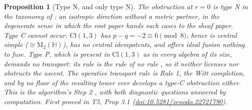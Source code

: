 \documentclass[11pt]{article}
\newtheorem{proposition}[theorem]{Proposition}
\theoremstyle{definition}
\theoremstyle{plain}
\providecommand{\Cl}{}\renewcommand{\Cl}{\mathrm{Cl}}
\providecommand{\HH}{}\renewcommand{\HH}{\mathbb{H}}
\providecommand{\Mat}{}\renewcommand{\Mat}{\mathrm{M}}
\begin{document}
\begin{proposition}[Type N, and only type N]\label{c:singularity.type-n-only-type-n}
The obstruction at $r = 0$ is type N in the taxonomy of \cite[\S 3]{ButlerT1}: an isotropic direction without a metric partner, in the degenerate sense in which the root paper hands such cases to the sheaf paper. Type C cannot occur: $\Cl(1,3)$ has $p - q = -2 \equiv 6 \pmod 8$, hence is central simple ($\cong \Mat_2(\HH)$), has no central idempotents, and offers ideal fusion nothing to fuse. Type P, which is present in $\Cl(1,3)$ as in every algebra of its size, demands no transport: its rule is the rule of no rule \cite[\S 6, Prop.~6.1]{ButlerT1}, so it neither licenses nor obstructs the ascent. The operative transport rule is Rule 1, the Witt completion, and by \cite[Thm.~3.6]{ButlerT3} no floor of the resulting tower ever develops a type-C obstruction either. This is the algorithm's Step 2 \cite[\S 8.1, Step 2]{ButlerT1}, with both diagnostic questions answered by computation.
\emph{First proved in} T5, Prop 3.1 (\href{https://doi.org/10.5281/zenodo.22721790}{doi:10.5281/zenodo.22721790}).
\end{proposition}
\end{document}
